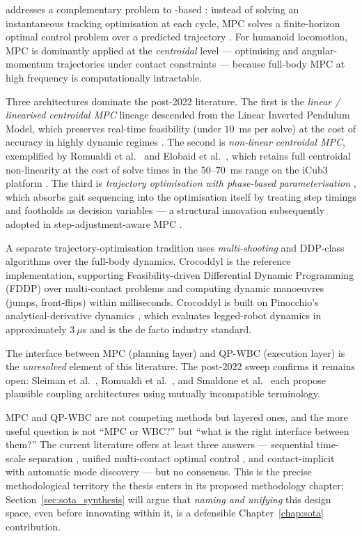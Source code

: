 \MPC{} addresses a complementary problem to \QP-based \WBC: instead of
solving an instantaneous tracking optimisation at each cycle, MPC solves
a finite-horizon optimal control problem over a predicted trajectory
\cite{Wensing2023Review}. For humanoid locomotion, MPC is dominantly
applied at the \emph{centroidal} level --- optimising \com{} and
angular-momentum trajectories under contact constraints
\cite{Caron2019,Romualdi2023,Elobaid2023} --- because full-body MPC at
high frequency is computationally intractable.

Three architectures dominate the post-2022 literature. The first is the
\emph{linear / linearised centroidal MPC} lineage descended from the
Linear Inverted Pendulum Model, which preserves real-time feasibility
(under $10$~ms per solve) at the cost of accuracy in highly dynamic
regimes \cite{Pajon2022}. The second is \emph{non-linear centroidal MPC},
exemplified by Romualdi et al.\ \cite{Romualdi2023} and Elobaid et al.\
\cite{Elobaid2023}, which retains full centroidal non-linearity at the
cost of solve times in the $50$--$70$~ms range on the iCub3 platform
\cite{Elobaid2023}. The third is \emph{trajectory optimisation with
phase-based parameterisation} \cite{Winkler2018}, which absorbs gait
sequencing into the optimisation itself by treating step timings and
footholds as decision variables --- a structural innovation subsequently
adopted in step-adjustment-aware MPC \cite{Romualdi2023}.

A separate trajectory-optimisation tradition uses \emph{multi-shooting}
and DDP-class algorithms over the full-body dynamics. Crocoddyl
\cite{Crocoddyl} is the reference implementation, supporting
Feasibility-driven Differential Dynamic Programming (FDDP) over
multi-contact problems and computing dynamic manoeuvres (jumps,
front-flips) within milliseconds. Crocoddyl is built on Pinocchio's
analytical-derivative dynamics \cite{Pinocchio}, which evaluates
legged-robot dynamics in approximately $3~\mu$s and is the de facto
industry standard.

The interface between MPC (planning layer) and QP-WBC (execution layer)
is the \emph{unresolved} element of this literature. The post-2022 sweep
confirms it remains open: Sleiman et al.\ \cite{Sleiman2021}, Romualdi et al.\
\cite{Romualdi2023}, and Smaldone et al.\ \cite{Smaldone2025} each propose
plausible coupling architectures using mutually incompatible terminology.

\begin{criticalinsight}
MPC and QP-WBC are not competing methods but layered ones, and the more
useful question is not ``MPC or WBC?'' but ``what is the right interface
between them?'' The current literature offers at least three answers ---
sequential time-scale separation \cite{Romualdi2023}, unified multi-contact
optimal control \cite{Sleiman2021}, and contact-implicit \MPC{} with
automatic mode discovery \cite{LeCleach2024} --- but no consensus. This is the precise methodological
territory the thesis enters in its proposed methodology chapter;
Section~\ref{sec:sota_synthesis} will argue that \emph{naming and unifying}
this design space, even before innovating within it, is a defensible
Chapter~\ref{chap:sota} contribution.
\end{criticalinsight}


